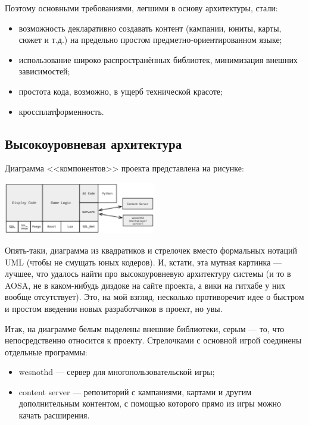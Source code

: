 \documentclass{../text-style}
\begin{document}
Поэтому основными требованиями, легшими в основу архитектуры, стали:
\begin{itemize}
    \item возможность декларативно создавать контент (кампании, юниты, карты, сюжет и т.д.) на предельно простом предметно-ориентированном языке;
    \item использование широко распространённых библиотек, минимизация внешних зависимостей;
    \item простота кода, возможно, в ущерб технической красоте;
    \item кроссплатформенность.
\end{itemize}

\subsection{Высокоуровневая архитектура}

Диаграмма <<компонентов>> проекта представлена на рисунке:

\begin{center}
    \includegraphics[width=0.5\textwidth]{wesnothArchitecture.png}
\end{center}

Опять-таки, диаграмма из квадратиков и стрелочек вместо формальных нотаций UML (чтобы не смущать юных кодеров). И, кстати, эта мутная картинка --- лучшее, что удалось найти про высокоуровневую архитектуру системы (и то в AOSA, не в каком-нибудь диздоке на сайте проекта, а вики на гитхабе у них вообще отсутствует). Это, на мой взгляд, несколько противоречит идее о быстром и простом введении новых разработчиков в проект, но увы.

Итак, на диаграмме белым выделены внешние библиотеки, серым --- то, что непосредственно относится к проекту. Стрелочками с основной игрой соединены отдельные программы:

\begin{itemize}
    \item wesnothd --- сервер для многопользовательской игры;
    \item content server --- репозиторий с кампаниями, картами и другим дополнительным контентом, с помощью которого прямо из игры можно качать расширения.
\end{itemize}
\end{document}
